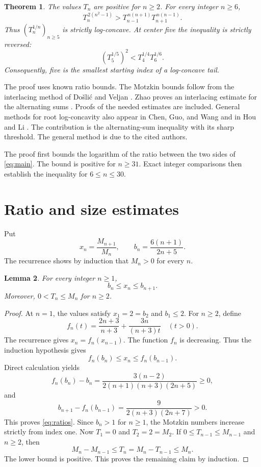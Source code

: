 \documentclass[11pt]{article}
\newtheorem{theorem}{Theorem}
\newtheorem{lemma}[theorem]{Lemma}
\begin{document}
\begin{theorem}\label{thm:main}
The values $T_n$ are positive for $n\ge2$. For every integer $n\ge6$,
\begin{equation}\label{eq:main}
T_n^{\,2(n^2-1)}>
T_{n-1}^{\,n(n+1)}T_{n+1}^{\,n(n-1)}.
\end{equation}
Thus $(T_n^{1/n})_{n\ge5}$ is strictly log-concave.
At center five the inequality is strictly reversed:
\begin{equation}\label{eq:failure}
(T_5^{1/5})^2<T_4^{1/4}T_6^{1/6}.
\end{equation}
Consequently, five is the smallest starting index of a log-concave tail.
\end{theorem}

The proof uses known ratio bounds.
The Motzkin bounds follow from the interlacing method of Do\v{s}li\'c and
Veljan \cite{DV}. Zhao proves an interlacing estimate for the alternating
sums \cite[eqs.~(7)--(8)]{Zhao}. Proofs of the needed estimates are included.
General methods for root log-concavity also appear in
Chen, Guo, and Wang \cite{CGW} and in Hou and Li \cite{HL}.
The contribution is the alternating-sum inequality with its sharp
threshold. The general method is due to the cited authors.

The proof first bounds the logarithm of the ratio between the two sides
of \eqref{eq:main}. The bound is positive for $n\ge31$.
Exact integer comparisons then establish the inequality for $6\le n\le30$.

\section{Ratio and size estimates}

Put
\[
x_n=\frac{M_{n+1}}{M_n},\qquad
b_n=\frac{6(n+1)}{2n+5}.
\]
The recurrence shows by induction that $M_n>0$ for every $n$.

\begin{lemma}\label{lem:ratios}
For every integer $n\ge1$,
\begin{equation}\label{eq:ratios}
b_n\le x_n\le b_{n+1}.
\end{equation}
Moreover, $0<T_n\le M_n$ for $n\ge2$.
\end{lemma}

\begin{proof}
At $n=1$, the values satisfy $x_1=2=b_2$ and $b_1\le2$.
For $n\ge2$, define
\[
f_n(t)=\frac{2n+3}{n+3}+\frac{3n}{(n+3)t}\quad(t>0).
\]
The recurrence gives $x_n=f_n(x_{n-1})$.
The function $f_n$ is decreasing. Thus the induction hypothesis gives
\[
f_n(b_n)\le x_n\le f_n(b_{n-1}).
\]
Direct calculation yields
\[
f_n(b_n)-b_n
=\frac{3(n-2)}{2(n+1)(n+3)(2n+5)}\ge0,
\]
and
\[
b_{n+1}-f_n(b_{n-1})
=\frac{9}{2(n+3)(2n+7)}>0.
\]
This proves \eqref{eq:ratios}.
Since $b_n>1$ for $n\ge1$, the Motzkin numbers increase strictly from
index one. Now $T_1=0$ and $T_2=2=M_2$.
If $0\le T_{n-1}\le M_{n-1}$ and $n\ge2$, then
\[
M_n-M_{n-1}\le T_n=M_n-T_{n-1}\le M_n.
\]
The lower bound is positive. This proves the remaining claim by induction.
\end{proof}
\end{document}
